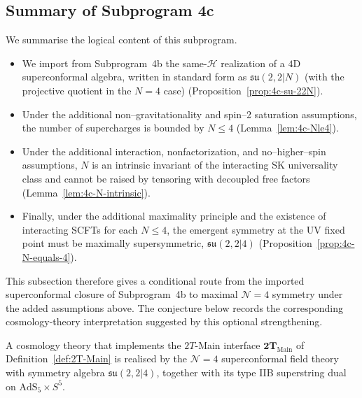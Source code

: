 \subsection{Summary of Subprogram 4c}
\label{subsec:4c-summary}

We summarise the logical content of this subprogram.

\begin{itemize}
  \item We import from Subprogram~4b the same-\(\mathcal H\)
        realization of a \(4\)D superconformal algebra, written in
        standard form as \(\mathfrak{su}(2,2|N)\) (with the projective
        quotient in the \(N=4\) case)
        (Proposition~\ref{prop:4c-su-22N}).

  \item Under the additional non--gravitationality and spin--2
        saturation assumptions, the number of supercharges is bounded by
        \(N\le4\)
        (Lemma~\ref{lem:4c-Nle4}).

  \item Under the additional interaction, nonfactorization, and
        no--higher--spin assumptions, \(N\) is an intrinsic invariant of
        the interacting SK universality class and cannot be raised by
        tensoring with decoupled free factors
        (Lemma~\ref{lem:4c-N-intrinsic}).

  \item Finally, under the additional maximality principle and the
        existence of interacting SCFTs for each \(N\le4\), the emergent
        symmetry at the UV fixed point must be maximally
        supersymmetric,
        \(\mathfrak{su}(2,2|4)\)
        (Proposition~\ref{prop:4c-N-equals-4}).

\end{itemize}

This subsection therefore gives a conditional route from the imported
superconformal closure of Subprogram~4b to maximal
\(\mathcal N=4\) symmetry under the added assumptions above.
The conjecture below records the corresponding cosmology-theory
interpretation suggested by this optional strengthening.
\begin{conjecture}
\label{conj:4c-string-realisation}
A cosmology theory that implements the \(2T\)-Main interface
\(\mathbf{2T}_{\mathrm{Main}}\) of Definition~\ref{def:2T-Main} is realised by
the \(\mathcal N=4\) superconformal field theory with symmetry algebra
\(\mathfrak{su}(2,2|4)\), together with its type IIB superstring dual on
\(\mathrm{AdS}_5\times S^5\).
\end{conjecture}
